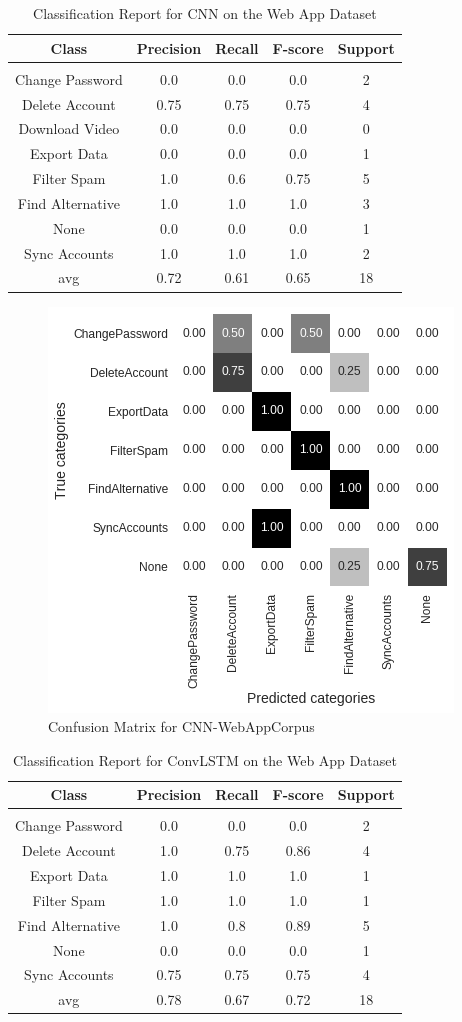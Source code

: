\documentclass[11pt, oneside]{article}   	%
\begin{document}
\newpage
\begin{table}[h]
\centering
\caption{Classification Report for CNN on the Web App Dataset}
\begin{tabular}{c | c c c c}
Class & Precision & Recall & F-score & Support\\
\hline
\hline\\
Change Password & 0.0 & 0.0 & 0.0 & 2\\
Delete Account & 0.75 & 0.75 & 0.75 & 4\\
Download Video & 0.0 & 0.0 & 0.0 & 0\\
Export Data & 0.0 & 0.0 & 0.0 & 1\\
Filter Spam & 1.0 & 0.6 & 0.75 & 5\\
Find Alternative & 1.0 & 1.0 & 1.0 & 3\\
None & 0.0 & 0.0 & 0.0 & 1\\
Sync Accounts & 1.0 & 1.0 & 1.0 & 2\\
avg & 0.72 & 0.61 & 0.65 & 18\\
\end{tabular}
\end{table}

\begin{figure}[h]
\centering
\includegraphics[width=0.5\linewidth]{CNN-WebAppCorpus}
\caption{Confusion Matrix for CNN-WebAppCorpus}
\label{fig:CNN-WebAppCorpus}
\end{figure}

\newpage
\begin{table}[h]
\centering
\caption{Classification Report for ConvLSTM on the Web App Dataset}
\begin{tabular}{c | c c c c}
Class & Precision & Recall & F-score & Support\\
\hline
\hline\\
Change Password & 0.0 & 0.0 & 0.0 & 2\\
Delete Account & 1.0 & 0.75 & 0.86 & 4\\
Export Data & 1.0 & 1.0 & 1.0 & 1\\
Filter Spam & 1.0 & 1.0 & 1.0 & 1\\
Find Alternative & 1.0 & 0.8 & 0.89 & 5\\
None & 0.0 & 0.0 & 0.0 & 1\\
Sync Accounts & 0.75 & 0.75 & 0.75 & 4\\
avg & 0.78 & 0.67 & 0.72 & 18\\
\end{tabular}
\end{table}
\end{document}
